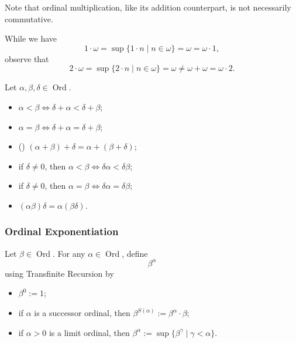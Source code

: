 \documentclass[notoc,notitlepage]{tufte-book}
\DeclareMathOperator{\Ord}{Ord }
\begin{document}
Note that ordinal multiplication, like its addition counterpart, is not necessarily commutative.

\begin{eg}
  While we have
  \begin{equation*}
    1 \cdot \omega = \sup \{ 1 \cdot n \mid n \in \omega \} = \omega = \omega \cdot 1,
  \end{equation*}
  observe that
  \begin{equation*}
    2 \cdot \omega = \sup \{ 2 \cdot n \mid n \in \omega \} = \omega \neq \omega + \omega = \omega \cdot 2.
  \end{equation*}
\end{eg}

\begin{propo}
\label{propo:properties_of_ordinal_addition_and_ordinal_multiplication}
  Let $\alpha, \beta, \delta \in \Ord$.
  \begin{itemize}
    \item $\alpha < \beta \iff \delta + \alpha < \delta + \beta$;
    \item $\alpha = \beta \iff \delta + \alpha = \delta + \beta$;
    \item () $(\alpha + \beta) + \delta = \alpha + (\beta + \delta)$;
    \item if $\delta \neq 0$, then $\alpha < \beta \iff \delta \alpha < \delta \beta$;
    \item if $\delta \neq 0$, then $\alpha = \beta \iff \delta \alpha = \delta \beta$;
    \item $(\alpha\beta)\delta = \alpha(\beta\delta)$.
  \end{itemize}
\end{propo}

\subsubsection{Ordinal Exponentiation}
\label{ssub:Ordinal Exponentiation}

\begin{defn}
\label{defn:ordinal_exponentiation}
  Let $\beta \in \Ord$. For any $\alpha \in \Ord$, define
  \begin{equation*}
    \beta^\alpha
  \end{equation*}
  using Transfinite Recursion by
  \begin{itemize}
    \item $\beta^0 := 1$;
    \item if $\alpha$ is a successor ordinal, then $\beta^{S(\alpha)} := \beta^{\alpha} \cdot \beta$;
    \item if $\alpha > 0$ is a limit ordinal, then $\beta^\alpha := \sup \{ \beta^\gamma \mid \gamma < \alpha \}$.
  \end{itemize}
\end{defn}
\end{document}
